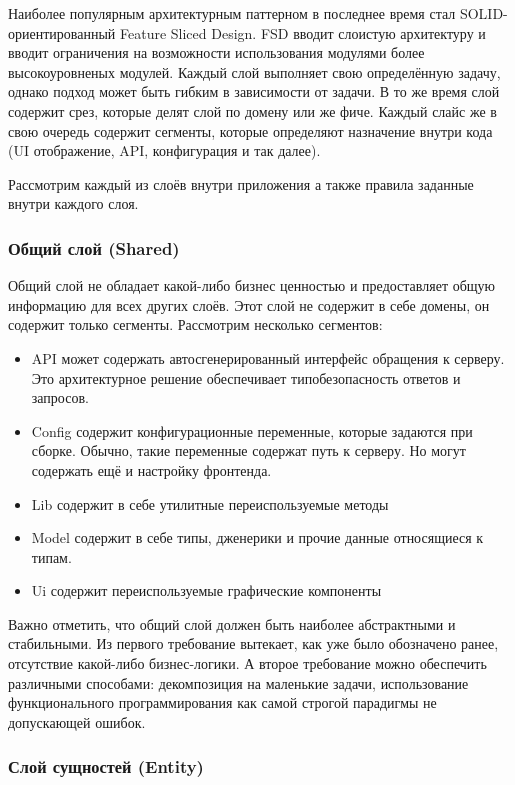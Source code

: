 \documentclass[14pt]{extarticle}
\begin{document}
Наиболее популярным архитектурным паттерном в последнее время стал SOLID-ориентированный Feature Sliced Design. FSD вводит слоистую архитектуру
и вводит ограничения на возможности использования модулями более высокоуровненых модулей. Каждый слой выполняет свою определённую задачу, однако 
подход может быть гибким в зависимости от задачи. В то же время слой содержит срез, которые делят слой по домену или же фиче. Каждый слайс же в свою очередь
содержит сегменты, которые определяют назначение внутри кода (UI отображение, API, конфигурация и так далее).

Рассмотрим каждый из слоёв внутри приложения а также правила заданные внутри каждого слоя.

\subsubsection{Общий слой (Shared)}

Общий слой не обладает какой-либо бизнес ценностью и предоставляет общую информацию для всех других слоёв. Этот слой не содержит в себе
домены, он содержит только сегменты. Рассмотрим несколько сегментов:

\begin{itemize}
	\item API может содержать автосгенерированный интерфейс обращения к серверу. Это архитектурное решение обеспечивает типобезопасность
	ответов и запросов.
	\item Config содержит конфигурационные переменные, которые задаются при сборке. Обычно, такие переменные содержат путь к серверу. Но могут
	содержать ещё и настройку фронтенда.
	\item Lib содержит в себе утилитные переиспользуемые методы
	\item Model содержит в себе типы, дженерики и прочие данные относящиеся к типам.
	\item Ui содержит переиспользуемые графические компоненты 
\end{itemize}

Важно отметить, что общий слой должен быть наиболее абстрактными и стабильными. Из первого требование вытекает, как уже было обозначено ранее, 
отсутствие какой-либо бизнес-логики. А второе требование можно обеспечить различными способами: декомпозиция на маленькие задачи, использование
функционального программирования как самой строгой парадигмы не допускающей ошибок.

\subsubsection{Слой сущностей (Entity)}
\end{document}
